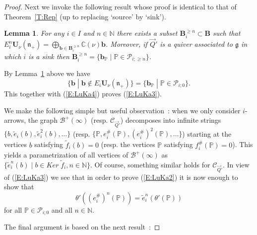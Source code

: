 \documentclass[a4paper,10pt]{amsart}
\def\U{\mathbf{U}}
\def\N{\mathbb{N}}
\def\C{\mathbb{C}}
\def\g{\mathfrak{g}}
\def\n{\mathfrak{n}}
\newtheorem{lem}[theo]{Lemma}
\numberwithin{equation}{section}
\begin{document}
\begin{proof}
\vspace{.1in}

Next we invoke the following result whose proof is identical to that of Theorem~\ref{T:Rep} (up to replacing `source' by `sink').

\begin{lem}\label{L:LuKa1} For any $i \in I$ and $n \in \N$  there exists a subset $\mathbf{B}_i^{\geq n} \subset \mathbf{B}$ such that $E_i^n\U_{\nu}(\n_+) = \bigoplus_{\mathbf{b} \in \mathbf{B}^{\geq n}_i} \C(\nu) \mathbf{b}$.
Moreover, if $\vec{Q}'$ is a quiver associated to $\g$ in which $i$ is a sink then $\mathbf{B}^{\geq n}_i=\{\mathbf{b}_{\mathbb{P}}\;|\; \mathbb{P} \in \mathcal{P}_{i; \geq n}\}$.
\end{lem}

\vspace{.1in}

By Lemma~\ref{L:LuKa1} above we have
$$\{\mathbf{b}\;|\; \mathbf{b} \not\in E_i\U_{\nu}(\n_+)\}=\{\mathbf{b}_{\mathbb{P}}\;|\; \mathbb{P} \in \mathcal{P}_{i;0}\}.$$
This together with (\ref{E:LuKa4}) proves (\ref{E:LuKa3}).

\vspace{.1in}

We make the following simple but useful observation~: when we only consider $i$-arrows, the graph $\mathcal{B}^+(\infty)$ (resp. $\mathcal{C}_{\vec{Q}'}$) decomposes into infinite strings $\{b, \tilde{e}_i(b), \tilde{e}_i^2(b), \ldots\}$ (resp. $\{\mathbb{P}, e_i^\#(\mathbb{P}), (e_i^\#)^2(\mathbb{P}), \ldots\}$) starting at the vertices $b$ satisfying $\tilde{f}_i(b)=0$ (resp. the vertices $\mathbb{P}$ satisfying $f_i^\#(\mathbb{P})=0$).
This yields a parametrization of all vertices of $\mathcal{B}^+(\infty)$ as $\{\tilde{e}_i^n(b)\;|\; b \in Ker\;\tilde{f}_i, n \in \N\}$.  Of course, something similar holds for $\mathcal{C}_{\vec{Q}'}$. In view of (\ref{E:LuKa3}) we see that in order to prove (\ref{E:LuKa2}) it is now enough to show that
\begin{equation}\label{E:LuKa5}
\theta'((e_i^\#)^n(\mathbb{P}))=\tilde{e}_i^n(\theta'(\mathbb{P}))
\end{equation}
for all $\mathbb{P} \in \mathcal{P}_{i;0}$ and all $n \in \N$.

\vspace{.1in}

The final argument is based on the next result~:


\end{proof}
\end{document}
